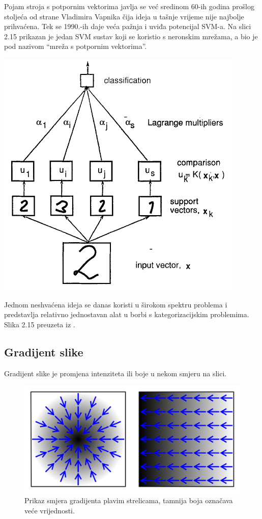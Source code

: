 \documentclass[times, utf8, zavrsni, numeric]{fer}
\begin{document}
Pojam stroja s potpornim vektorima javlja se već sredinom 60-ih godina prošlog stoljeća od strane
Vladimira Vapnika čija ideja u tašnje vrijeme nije najbolje prihvaćena. Tek se 1990.-ih daje 
veća pažnja i uviđa potencijal SVM-a. Na slici 2.15 prikazan je jedan SVM sustav koji se koristio s
neronskim mrežama, a bio je pod nazivom \enquote{mreža s potpornim vektorima}.

\begin{minipage}{\linewidth}
\vspace{10pt}
\centering
\includegraphics[width=0.7\linewidth]{img/svmnn.png}
\end{minipage}

\bigbreak

Jednom neshvaćena ideja se danas koristi u širokom spektru problema i predstavlja relativno
jednostavan alat u borbi s kategorizacijskim problemima. Slika 2.15 preuzeta iz \citep{vapnik}.


\newpage

\subsection{Gradijent slike}

Gradijent slike je promjena intenziteta ili boje u nekom smjeru na slici.

\begin{figure}[htbp]
\centering
\includegraphics[width=0.8\linewidth]{img/Gradient2.png}
\caption{Prikaz smjera gradijenta plavim strelicama, tamnija boja označava veće vrijednosti.}
\end{figure}
\end{document}
